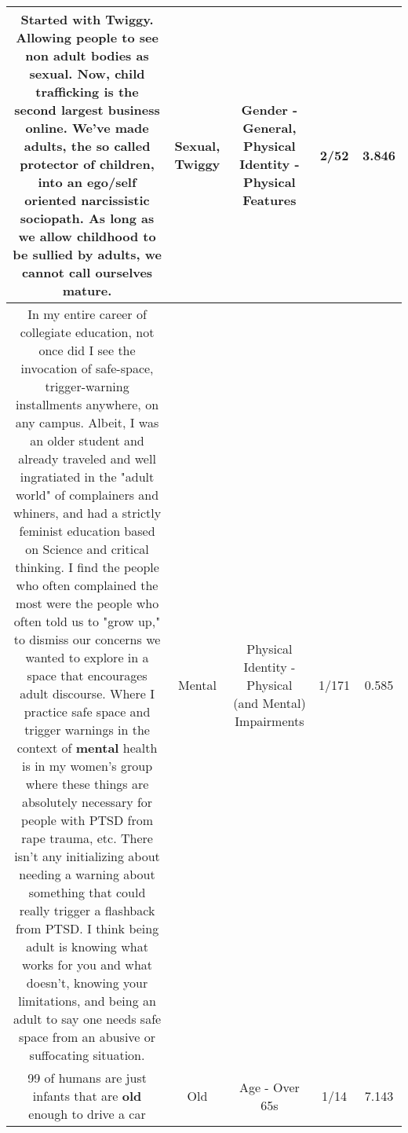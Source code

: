 \documentclass[11pt]{article}
\newlength\mylength
\begin{document}
\begin{center}
\begin{longtable}{|C{.65\mylength}|C{.30\mylength}|C{.12\mylength}|C{.12\mylength}|C{.12\mylength}|}
  \small Started  with \textbf{Twiggy}. Allowing people to see non adult bodies as \textbf{sexual}. Now, child trafficking is the second largest business  online. We've made adults, the so called protector of children, into an ego/self oriented narcissistic sociopath. As long as we allow childhood to be sullied by adults, we cannot call ourselves mature.\normalsize   & Sexual, Twiggy & Gender - General, Physical Identity - Physical Features & 2/52 & 3.846 \\  \hline
  \small In my entire career of collegiate education, not once did I see the invocation of safe-space, trigger-warning installments anywhere, on any campus. Albeit, I was an older student and already traveled and well ingratiated in the "adult world" of complainers and whiners, and had a strictly feminist education based on Science and critical thinking. I find the people who often complained the most were the people who often told us to "grow up," to dismiss our concerns we wanted to explore in a space that encourages adult discourse. Where I practice safe space and trigger warnings in the context of \textbf{mental} health is in my women's group where these things are absolutely necessary for people with PTSD from rape trauma, etc. There isn't any initializing about needing a warning about something that could really trigger a flashback from PTSD. I think being adult is knowing what works for you and what doesn't, knowing your limitations, and being an adult to say one needs safe space from an abusive or suffocating situation.\normalsize   & Mental & Physical Identity - Physical (and Mental) Impairments & 1/171 & 0.585 \\  \hline
  \small 99 of humans are just infants that are \textbf{old} enough to drive a car\normalsize   & Old & Age - Over 65s & 1/14 & 7.143 \\  \hline

\end{longtable}
\end{center}
\end{document}
